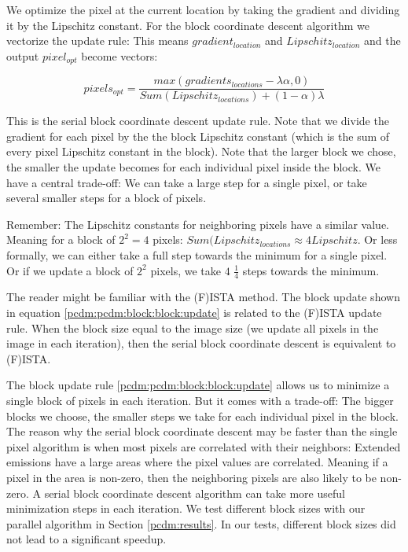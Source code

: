 We optimize the pixel at the current location by taking the gradient and dividing it by the Lipschitz constant. For the block coordinate descent algorithm we vectorize the update rule: This means $gradient_{location}$ and $Lipschitz_{location}$ and the output $pixel_{opt}$ become vectors:

\begin{equation} \label{pcdm:pcdm:block:block:update}
pixels_{opt} = \frac{max(gradients_{locations} - \lambda\alpha, 0)}{Sum(Lipschitz_{locations}) + (1 - \alpha)\lambda}
\end{equation}

This is the serial block coordinate descent update rule. Note that we divide the gradient for each pixel by the the block Lipschitz constant (which is the sum of every pixel Lipschitz constant in the block). Note that the larger block we chose, the smaller the update becomes for each individual pixel inside the block. We have a central trade-off: We can take a large step for a single pixel, or take several smaller steps for a block of pixels. 

Remember: The Lipschitz constants for neighboring pixels have a similar value. Meaning for a block of $2^2 = 4$ pixels: $Sum(Lipschitz_{locations} \approx 4 Lipschitz$. Or less formally, we can either take a full step towards the minimum for a single pixel. Or if we update a block of $2^2$ pixels, we take $4$ $\frac{1}{4}$ steps towards the minimum.

The reader might be familiar with the (F)ISTA method\cite{beck2009fista}. The block update shown in equation \eqref{pcdm:pcdm:block:block:update} is related to the (F)ISTA update rule. When the block size equal to the image size (we update all pixels in the image in each iteration), then the serial block coordinate descent is equivalent to (F)ISTA.

The block update rule \eqref{pcdm:pcdm:block:block:update} allows us to minimize a single block of pixels in each iteration. But it comes with a trade-off: The bigger blocks we choose, the smaller steps we take for each individual pixel in the block. The reason why the serial block coordinate descent may be faster than the single pixel algorithm is when most pixels are correlated with their neighbors: Extended emissions have a large areas where the pixel values are correlated. Meaning if a pixel in the area is non-zero, then the neighboring pixels are also likely to be non-zero. A serial block coordinate descent algorithm can take more useful minimization steps in each iteration. We test different block sizes with our parallel algorithm in Section \ref{pcdm:results}. In our tests, different block sizes did not lead to a significant speedup.

